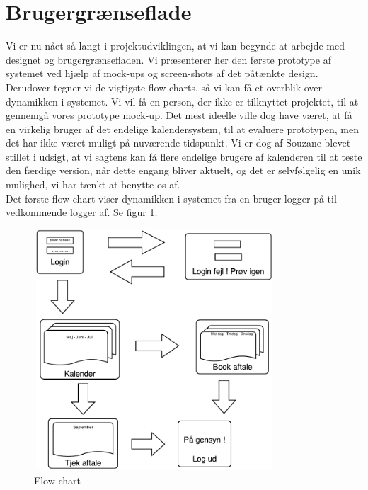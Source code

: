 \documentclass[12pt]{article}   %
\begin{document}
\section{Brugergrænseflade}
Vi er nu nået så langt i projektudviklingen, at vi kan begynde at arbejde med designet og brugergrænsefladen. Vi præsenterer her den første prototype af systemet ved hjælp af mock-ups og screen-shots af det påtænkte design. Derudover tegner vi de vigtigste flow-charts, så vi kan få et overblik over dynamikken i systemet. Vi vil få en person, der ikke er tilknyttet projektet, til at gennemgå vores prototype mock-up. Det mest ideelle ville dog have været, at få en virkelig bruger af det endelige kalendersystem, til at evaluere prototypen, men det har ikke været muligt på nuværende tidspunkt. Vi er dog af Souzane blevet stillet i udsigt, at vi sagtens kan få flere endelige brugere af kalenderen til at teste den færdige version, når dette engang bliver aktuelt, og det er selvfølgelig en unik mulighed, vi har tænkt at benytte os af. \\
Det første flow-chart viser dynamikken i systemet fra en bruger logger på til vedkommende logger af. Se figur \ref{fig:flow1}.\\


\begin{figure}[!ht]
\begin{center}
\includegraphics[width=9cm, height=9cm]{flow1.pdf}
\caption{Flow-chart}
\label{fig:flow1}
\end{center}
\end{figure}
\end{document}
